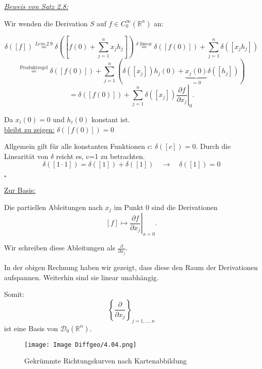 \documentclass[fleqn, 12pt, letterpaper]{article}
\newcommand{\txt}[1]{\text{#1}}
\begin{document}
\underline{\textit{Beweis von Satz 2.8:}}

Wir wenden die Derivation \( S \) auf \( f \in C_0^\infty(\mathbb{R}^n) \) an:

\[
\delta([f]) 
 \overset{Lem. 2.9}= \delta\left( [f(0) + \sum_{j=1}^n x_j h_j ]\right)
\overset{\delta\;\txt{linear}}= \delta([f(0)]) + \sum_{j=1}^n \delta\left( [x_j h_j] \right)
\]
\[
\overset{\txt{Produktregel}}{=} \delta([f(0)]) + \sum_{j=1}^n \left( \delta([x_j]) h_j(0) + \underbrace{x_j(0)}_{=0}\delta([h_j]) \right)
\]
\[
= \delta([f(0)]) + \sum_{j=1}^n \delta([x_j]) \left. \frac{\partial f}{\partial x_j} \right|_{0}.
\]

Da \( x_i(0) = 0 \) und \( h_i(0) \) konstant ist.\\

\underline{bleibt zu zeigen:} \(\delta([f(0)]) = 0\)

Allgemein gilt für alle konstanten Funktionen \(c\): \(\delta([c]) = 0.\)
Durch die Linearität von \(\delta\) reicht es, c=1 zu betrachten.
\[\delta([1 \cdot 1]) = \delta([1]) + \delta([1]) \quad \rightarrow \quad \delta([1]) = 0\]

\hfill \(\square\)

\underline{Zur Basis:}

Die partiellen Ableitungen nach \(x_j\) im Punkt \(0\) sind die Derivationen
\[
[f] \mapsto \left. \frac{\partial f}{\partial x_j} \right|_{x=0}.
\]

Wir schreiben diese Ableitungen als
\(\frac{\partial}{\partial x_j}.\)

In der obigen Rechnung haben wir gezeigt, dass diese den Raum der Derivationen aufspannen.  
Weiterhin sind sie linear unabhängig.

Somit:
\[
\left\{ \frac{\partial}{\partial x_j} \right\}_{j=1,\dotsc,n}
\]
ist eine Basis von \( \mathcal{D}_0(\mathbb{R}^n) \).

\begin{figure}[H]
  \centering
  \texttt{[image: Image Diffgeo/4.04.png]}
\caption{Gekrümmte Richtungskurven nach Kartenabbildung}
\end{figure}
\end{document}
